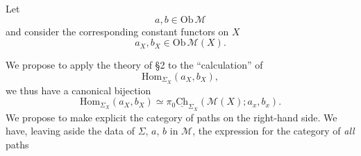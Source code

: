\documentclass[11pt]{article}
\newcommand{\msp}[1]{\marginpar{\footnotesize [#1]}}
\newcommand{\uCh}{\underline{\mathrm{Ch}}}
\newcommand{\Hom}{\mathrm{Hom}}
\begin{document}
Let
\[
a, b \in \mathrm{Ob}\,\mathcal{M}
\]
and consider the corresponding constant functors on $X$
\[
a_X, b_X \in \mathrm{Ob}\,\mathcal{M}(X).
\]

\msp{page 29}We propose to apply the theory of \S2 to the ``calculation'' of
\[
\Hom_{\Sigma_X}(a_X, b_X),
\]
we thus have a canonical bijection
\[
\boxed{\Hom_{\Sigma_X}(a_X, b_X) \simeq \pi_0\uCh_{\Sigma_X}(\mathcal{M}(X); a_x, b_x).} %
\]
We propose to make explicit the category of paths on the right-hand side. We have, leaving aside the data of $\Sigma$, $a$, $b$ in $\mathcal{M}$, the expression for the category of \textit{all} paths
\end{document}

